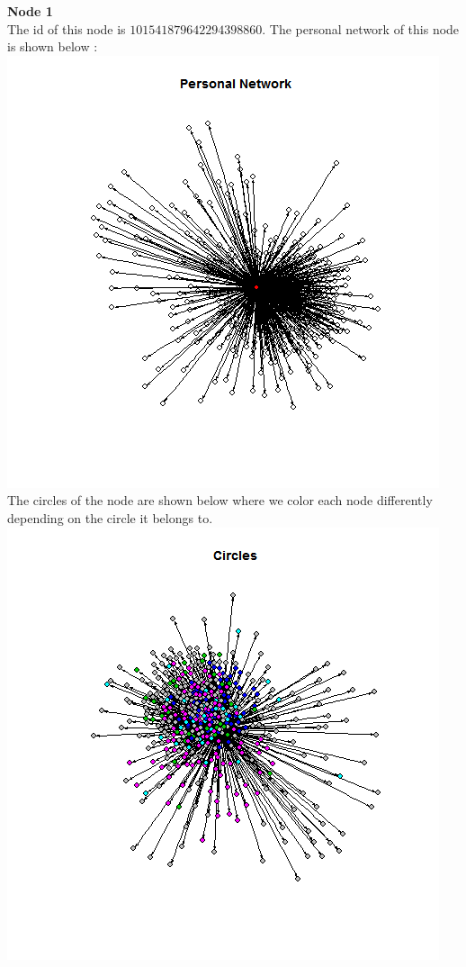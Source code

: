 \documentclass{article}
\begin{document}
\textbf{Node 1 }\\
The id of this node is $101541879642294398860$.
The personal network of this node is shown below :\\
\includegraphics[scale=0.6]{7_1a} \\
The circles of the node are shown below where we color each node differently
depending on the circle it belongs to.\\
\includegraphics[scale=0.6]{7_1d} \\
\end{document}
